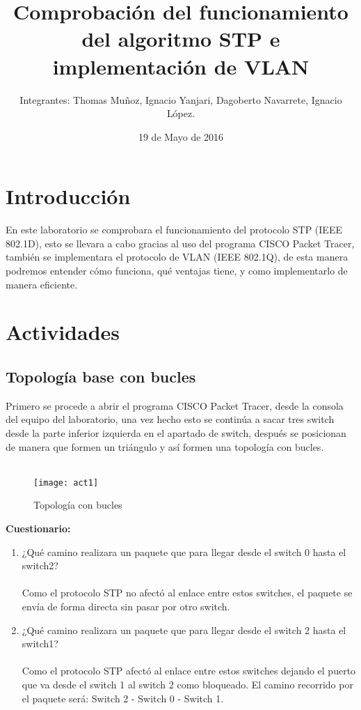 \documentclass{udpreport}
\title{Comprobación del funcionamiento del algoritmo STP e implementación de VLAN}
\author{Integrantes: Thomas Muñoz, Ignacio Yanjari, Dagoberto Navarrete, Ignacio López.}
\date{19 de Mayo de 2016}
\begin{document}
\maketitle
\tableofcontents
\listoffigures
\chapter{Introducción}
  En este laboratorio se comprobara el funcionamiento del protocolo STP (IEEE 802.1D),  esto se llevara a cabo gracias al uso del programa CISCO Packet Tracer, también se implementara el protocolo de  VLAN (IEEE 802.1Q), de esta manera podremos entender cómo funciona, qué  ventajas tiene, y como implementarlo de manera eficiente.
\chapter{Actividades}
	\section{Topología base con bucles}
	Primero se procede a abrir el programa CISCO Packet Tracer, desde la consola del equipo del laboratorio, una vez hecho esto se
	continúa a sacar tres switch desde la parte inferior izquierda en el apartado de switch, después se posicionan de manera que
	formen un triángulo y así formen una topología con bucles.\\\\
	\begin{figure}[H]
    \centering
    \texttt{[image: act1]}
    \caption{Topología con bucles}
    \end{figure}
    
	{\large \bf{Cuestionario: }}\\
	\begin{enumerate}
	    \item ¿Qué camino realizara un paquete que para llegar desde el switch
                0 hasta el switch2?\\\\
                 Como el protocolo STP no afectó al enlace entre estos switches, el paquete se envía de forma directa sin pasar por otro switch.
    
        \item ¿Qué camino realizara un paquete que para llegar desde el switch
            2 hasta el switch1?\\\\
            Como el protocolo STP afectó al enlace entre estos switches dejando el puerto que va desde el switch 1 al switch 2 como bloqueado. El camino recorrido por el paquete será: Switch 2 - Switch 0 - Switch 1.\\\\\\\\\\\ 
	\end{enumerate}
\end{document}
